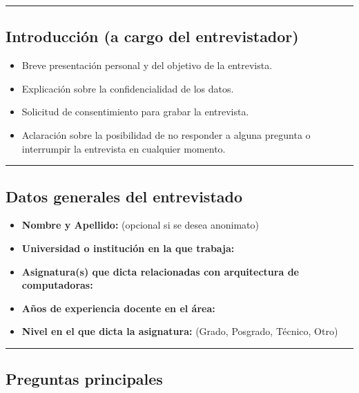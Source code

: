 \documentclass[12pt,oneside]{templates/unerthesis}
\providecommand{\tightlist}{%
  \setlength{\itemsep}{0pt}\setlength{\parskip}{0pt}}
\begin{document}
\begin{center}\rule{0.5\linewidth}{0.5pt}\end{center}

\hypertarget{introducciuxf3n-a-cargo-del-entrevistador}{%
\subsection{Introducción (a cargo del entrevistador)}\label{introducciuxf3n-a-cargo-del-entrevistador}}

\begin{itemize}
\tightlist
\item
  Breve presentación personal y del objetivo de la entrevista.
\item
  Explicación sobre la confidencialidad de los datos.
\item
  Solicitud de consentimiento para grabar la entrevista.
\item
  Aclaración sobre la posibilidad de no responder a alguna pregunta o interrumpir la entrevista en cualquier momento.
\end{itemize}

\begin{center}\rule{0.5\linewidth}{0.5pt}\end{center}

\hypertarget{datos-generales-del-entrevistado}{%
\subsection{Datos generales del entrevistado}\label{datos-generales-del-entrevistado}}

\begin{itemize}
\tightlist
\item
  \textbf{Nombre y Apellido:} (opcional si se desea anonimato)
\item
  \textbf{Universidad o institución en la que trabaja:}
\item
  \textbf{Asignatura(s) que dicta relacionadas con arquitectura de computadoras:}
\item
  \textbf{Años de experiencia docente en el área:}
\item
  \textbf{Nivel en el que dicta la asignatura:} (Grado, Posgrado, Técnico, Otro)
\end{itemize}

\begin{center}\rule{0.5\linewidth}{0.5pt}\end{center}

\hypertarget{preguntas-principales}{%
\subsection{Preguntas principales}\label{preguntas-principales}}
\end{document}
